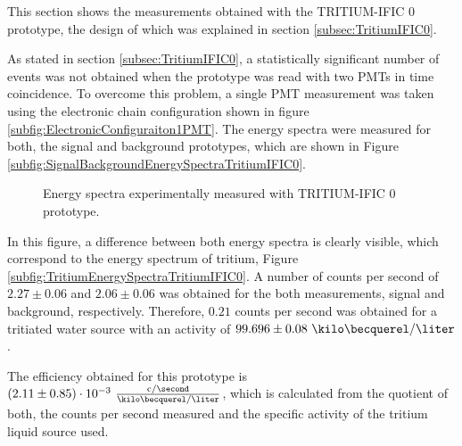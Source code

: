 This section shows the measurements obtained with the TRITIUM-IFIC 0 prototype, the design of which was explained in section \ref{subsec:TritiumIFIC0}.

As stated in section \ref{subsec:TritiumIFIC0}, a statistically significant number of events was not obtained when the prototype was read with two PMTs in time coincidence. To overcome this problem, a single PMT measurement was taken using the electronic chain configuration shown in figure \ref{subfig:ElectronicConfiguraiton1PMT}. The energy spectra were measured for both, the signal and background prototypes, which are shown in Figure \ref{subfig:SignalBackgroundEnergySpectraTritiumIFIC0}.

\begin{figure}[h]
 \centering
   \newline
 \caption{Energy spectra experimentally measured with TRITIUM-IFIC 0 prototype.}
 \label{fig:EnergySpectraTRITIUMIFIC0}
\end{figure}


In this figure, a difference between both energy spectra is clearly visible, which correspond to the energy spectrum of tritium, Figure \ref{subfig:TritiumEnergySpectraTritiumIFIC0}. A number of counts per second of $2.27 \pm 0.06$ and $2.06 \pm 0.06$ was obtained for the both measurements, signal and background, respectively. Therefore, $0.21$ counts per second was obtained for a tritiated water source with an activity of $99.696\pm 0.08~\kilo\becquerel/\liter$.

The efficiency obtained for this prototype is $(2.11 \pm 0.85)\cdot{} 10^{-3}~ \frac{\text{c}/\second}{\kilo\becquerel/\liter}$, which is calculated from the quotient of both, the counts per second measured and the specific activity of the tritium liquid source used.

